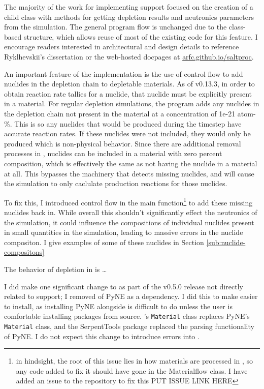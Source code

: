 The majority of the work for implementing \OpenMC support focused on the
creation of a child class with methods for getting depletion results and
neutronics parameters from the \OpenMC simulation. The general program
flow is unchanged due to the class-based structure, which allows reuse of most
of the existing code for this feature. I encourage readers interested in
architectural and design details to reference Ryklhevskii's dissertation
\cite{rykhlevskii_fuel_2020} or the web-hosted \SaltProc docpages at
\url{arfc.github.io/saltproc}.


An important feature of the \OpenMC implementation is the use of control flow
to add nuclides in the depletion chain to depletable materials. As of \OpenMC
v0.13.3, in order to obtain reaction rate tallies for a nuclide, that nuclide
must be explicitly present in a material. For regular \OpenMC depletion
simulations, the program adds any nuclides in the depletion chain not present
in the material at a concentration of 1e-21 atom-\%. This is so any nuclides
that would be produced during the timestep have accurate reaction rates. If
these nuclides were not included, they would only be produced which is
non-physical behavior. Since there are additional removal processes in
\SaltProc, nuclides can be included in a material with zero percent composition,
which is effectively the same as not having the nuclide in a material at all. This
bypasses the \OpenMC machinery that detects missing nuclides, and will cause
the simulation to only caclulate production reactions for those nuclides.

To fix this, I introduced control flow in the main function\footnote{in hindsight,
the root of this issue lies in how materials are processed in \SaltProc, so any code
added to fix it should have gone in the Materialflow class. I have
added an issue to the repository to fix this PUT ISSUE LINK HERE}
to add these missing nuclides back in. While overall this shouldn't
significantly effect the neutronics of the simulation, it could influence the
compositions of individual nuclides present in small quantities in the
simulation, leading to massive errors in the nuclide compositon. I give
examples of some of these nuclides in Section \ref{sub:nuclide-compositons}

The behavior of depletion in \SerpentTWO is \ldots

I did make one significant change to \SaltProc as part of the v0.5.0 release
not directly related to \OpenMC support; I removed of PyNE as a dependency.
I did this to make \SaltProc easier to install, as installing PyNE alongside
\OpenMC is difficult to do unless the user is comfortable installing packages
from source. \OpenMC's \verb.Material. class replaces PyNE's \verb.Material.
class, and the SerpentTools package replaced the \SerpentTWO parsing
functionality of PyNE. I do not expect this change to introduce errors into
\SaltProc.

